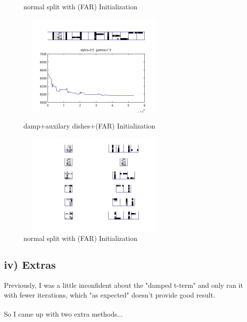 \documentclass{article}
\begin{document}
\begin{spacing}{1.1}
\begin{figure}[h]
\begin{minipage}[b]{0.5\textwidth}
    \caption{normal split with (FAR) Initialization}
    \label{fig:by:table}  
   \end{minipage}%
\end{figure}
\begin{figure}[h] 
  \begin{minipage}[b]{0.5\textwidth} 
    \centering 
    \includegraphics[width=3in,height=2in]{shape_damped_split_2.jpg} 
    \caption{damp+auxilary dishes+(FAR) Initialization}
    \label{fig:by:table} 
  \end{minipage}%
  \begin{minipage}[b]{0.5\textwidth} 
    \centering 
    \includegraphics[width=3in,height=2in]{shape_damp_end_2.jpg} 
    \caption{normal split with (FAR) Initialization}
    \label{fig:by:table}  
   \end{minipage}%
\end{figure}

\subsection{iv) Extras}
Previously, I was a little inconfident about the "damped t-term" and only ran it with fewer iterations, which "as expected" doesn't provide good result.\\ \\
So I came up with two extra methods...\\ \\


\end{spacing}
\end{document}
